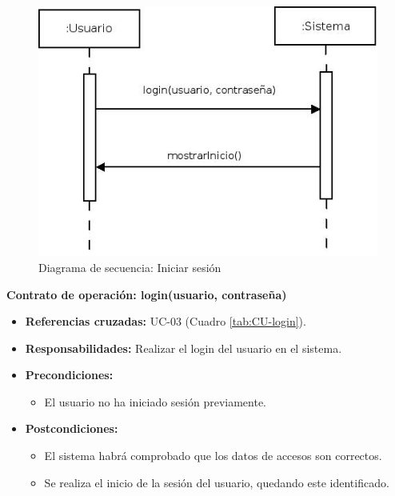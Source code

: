 \begin{figure}[H]
\centering
  \includegraphics[scale=.55]{img/secuencias/gestion-usuarios-login.jpeg}
  \caption{Diagrama de secuencia: Iniciar sesión}
  \label{fig:secuencia-gestion-usuarios-login}
\end{figure}


\textbf{Contrato de operación: login(usuario, contraseña)}
\begin{itemize}
\item \textbf{Referencias cruzadas:} UC-03 (Cuadro \ref{tab:CU-login}).
\item \textbf{Responsabilidades:} Realizar el login del usuario en el sistema.
\item \textbf{Precondiciones:} 
 \begin{itemize}
\item El usuario no ha iniciado sesión previamente.
\end {itemize}
\item \textbf{Postcondiciones:} 
 \begin{itemize}
\item El sistema habrá comprobado que los datos de accesos son correctos.
\item Se realiza el inicio de la sesión del usuario, quedando este identificado.
\end {itemize}
\end {itemize}

